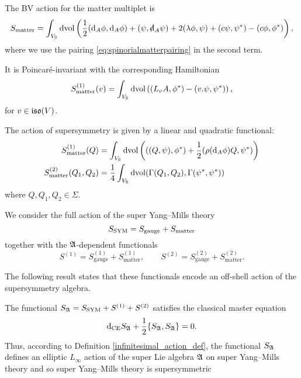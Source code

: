 \documentclass[10pt, oneside]{article}
\newcommand{\gauge}{\mathrm{gauge}}
\newcommand{\matter}{\mathrm{matter}}
\begin{document}
The BV action for the matter multiplet is
\begin{equation}\label{matteraction}
S_{\matter} = \int_{V_\RR} \dvol \left(\frac{1}{2}  (\d_A \phi, \d_A \phi) + (\psi , \sd \d_A \psi) + 2 (\lambda\phi, \psi) + (c\psi, \psi^*) - (c\phi, \phi^*)\right),
\end{equation}
where we use the pairing \eqref{eq:spinorialmatterpairing} in the second term.

It is Poincar\'{e}-invariant with the corresponding Hamiltonian
\begin{equation}
S_{\matter}^{(1)}(v) = \int_{V_\RR}\dvol\left( (L_{v}A, \phi^*) - (v.\psi, \psi^*)\right),
\label{eq:matterPoincareaction}
\end{equation}
for $v\in\mathfrak{iso}(V)$.

The action of supersymmetry is given by a linear and quadratic functional:
\begin{align}
S_{\matter}^{(1)} (Q) & = \int_{V_\RR}\dvol\left( ((Q, \psi), \phi^*) + \frac{1}{2}(\rho(\d_A \phi) Q, \psi^*)\right) \label{eq:matterI1} \\
S_{\matter}^{(2)} (Q_1 , Q_2) & = \frac{1}{4}\int_{V_\RR} \dvol(\Gamma(Q_1, Q_2) , \Gamma(\psi^*, \psi^*)) \label{eq:matterI2}
\end{align}
where $Q, Q_1,Q_2 \in \Sigma$.

We consider the full action of the super Yang--Mills theory
\[S_{\rm SYM} = S_{\gauge} + S_{\matter}\]
together with the $\mathfrak A$-dependent functionals
\[S^{(1)} = S^{(1)}_{\gauge} + S^{(1)}_{\matter},\qquad S^{(2)} = S^{(2)}_{\gauge} + S^{(2)}_{\matter}.\]

The following result states that these functionals encode an off-shell action of the supersymmetry algebra.

\begin{theorem}
The functional $S_{\mathfrak A} = S_{\rm SYM} + S^{(1)} + S^{(2)}$ satisfies the classical master equation
\begin{equation}
\label{CMEYM}
{\rm d}_{\mathrm{CE}} S_\mathfrak A + \frac{1}{2} \{S_\mathfrak A, S_\mathfrak A\} = 0 .
\end{equation}
Thus, according to Definition \ref{infinitesimal_action_def}, the functional $S_{\mathfrak A}$ defines an elliptic $L_\infty$ action of the super Lie algebra $\mathfrak A$ on super Yang--Mills theory and so super Yang--Mills theory is supersymmetric
\label{thm:YMSUSY}
\end{theorem}
\end{document}
